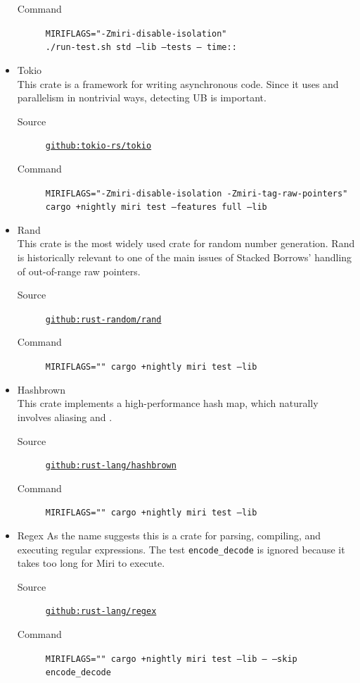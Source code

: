 \documentclass[a4paper,11pt]{article}
\theoremstyle{plain}
\theoremstyle{definition}
\theoremstyle{remark}
\newcommand{\tcode}[1]{\rstinline{#1}}
\begin{document}
\begin{itemize}
\begin{description}
            \item[Command] \texttt{MIRIFLAGS="-Zmiri-disable-isolation"}\\
                \texttt{./run-test.sh std --lib --tests -- time::}
        \end{description}
    \item Tokio\\
        This crate is a framework for writing asynchronous code. Since it uses \tcode{unsafe} and
        parallelism in nontrivial ways, detecting UB is important.
        \begin{description}
            \item[Source] \href{https://github.com/tokio-rs/tokio}{\texttt{github:tokio-rs/tokio}}
            \item[Command] \texttt{MIRIFLAGS="-Zmiri-disable-isolation -Zmiri-tag-raw-pointers"} \\
                \texttt{cargo +nightly miri test --features full --lib}
        \end{description}
    \item Rand\\
        This crate is the most widely used crate for random number generation.
        Rand is historically relevant to one of the main
        issues \cite{issue_raw_range_strict}
        of Stacked Borrows' handling of out-of-range raw pointers.
        \begin{description}
            \item[Source] \href{https://github.com/rust-random/rand}{\texttt{github:rust-random/rand}}
            \item[Command] \texttt{MIRIFLAGS="" cargo +nightly miri test --lib}
        \end{description}
    \item Hashbrown\\
        This crate implements a high-performance hash map, which naturally involves aliasing and \tcode{unsafe}.
        \begin{description}
            \item[Source] \href{https://github.com/rust-lang/hashbrown}{\texttt{github:rust-lang/hashbrown}}
            \item[Command] \texttt{MIRIFLAGS="" cargo +nightly miri test --lib}
        \end{description}
    \item Regex
        As the name suggests this is a crate for parsing, compiling, and executing regular expressions.
        The test \texttt{encode\_decode} is ignored because it takes too long for Miri to execute.
        \begin{description}
            \item[Source] \href{https://github.com/rust-lang/regex}{\texttt{github:rust-lang/regex}}
            \item[Command] \texttt{MIRIFLAGS="" cargo +nightly miri test --lib -- --skip encode\_decode}
        \end{description}
\end{itemize}
\end{document}
